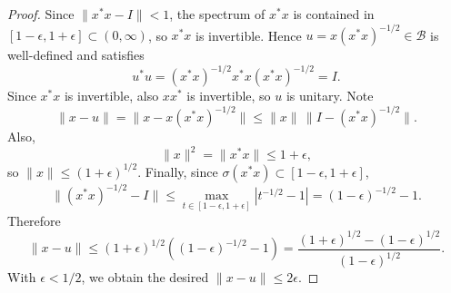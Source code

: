 \documentclass[10pt,a4paper]{amsart}
\newcommand{\cB}{\mathcal B}
\begin{document}
\begin{proof}
Since $\|x^*x-I\|<1$, the spectrum of $x^*x$ is contained in $[1-\epsilon,1+\epsilon] \subset (0,\infty)$, so $x^*x$ is invertible. Hence $u=x(x^*x)^{-1/2} \in \cB$ is well-defined and satisfies
\[
u^*u=(x^*x)^{-1/2}x^*x(x^*x)^{-1/2}=I.
\]
Since $x^*x$ is invertible, also $xx^*$ is invertible, so $u$ is unitary. Note
\[
\|x-u\|
=
\|x-x(x^*x)^{-1/2}\|
\le
\|x\|\,\|I-(x^*x)^{-1/2}\|.
\]
Also,
\[
\|x\|^2=\|x^*x\| \le 1+\epsilon,
\]
so $\|x\| \le (1+\epsilon)^{1/2}$. Finally, since $\sigma(x^*x)\subset [1-\epsilon,1+\epsilon]$,
\[
\|(x^*x)^{-1/2}-I\|
\le
\max_{t\in[1-\epsilon,1+\epsilon]} |t^{-1/2}-1|
=
(1-\epsilon)^{-1/2}-1.
\]
Therefore
\[
\|x-u\|
\le
(1+\epsilon)^{1/2}\left((1-\epsilon)^{-1/2}-1\right)
=
\frac{(1+\epsilon)^{1/2}-(1-\epsilon)^{1/2}}{(1-\epsilon)^{1/2}}.
\]
With $\epsilon<1/2$,  we obtain the desired $\|x-u\|\le 2\epsilon$.
\end{proof}
\end{document}
